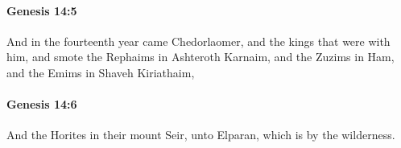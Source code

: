 		\paragraph{Genesis 14:5} %
			\label{GENESIS-14-5}

			And in the fourteenth year came Chedorlaomer, and the kings that were with him, and smote the Rephaims in Ashteroth Karnaim, and the Zuzims in Ham, and the Emims in Shaveh Kiriathaim,


		\paragraph{Genesis 14:6} %
			\label{GENESIS-14-6}

			And the Horites in their mount Seir, unto Elparan, which is by the wilderness.


